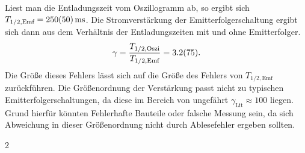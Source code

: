 \documentclass[10pt]{article}
\newenvironment{Figure}
  {\par\medskip\noindent\minipage{\linewidth}}
  {\endminipage\par\medskip}
\begin{document}
\begin{multicols}{2}
\begin{Figure}
        \end{Figure}
        Liest man die Entladungszeit vom Oszillogramm ab, so ergibt sich $T_{1/2,\text{Emf}}=\SI{250+-50}{\milli s}$.
        Die Stromverstärkung der Emitterfolgerschaltung ergibt sich dann aus dem Verhältnis der Entladungszeiten mit und ohne Emitterfolger.
        \begin{align} 
                \gamma =\dfrac{T_{1/2,\text{Oszi}}}{T_{1/2,\text{Emf}}}=\SI{3.2+-7.5}{}
        .\end{align} 
        Die Größe dieses Fehlers lässt sich auf die Größe des Fehlers von $T_{1/2,\text{Emf}}$ zurückführen.
        Die Größenordnung der Verstärkung passt nicht zu typischen Emitterfolgerschaltungen, da diese im Bereich von ungefährt $\gamma _{\text{Lit}}\approx 100$ liegen.
        Grund hierfür könnten Fehlerhafte Bauteile oder falsche Messung sein, da sich Abweichung in dieser Größenordnung nicht durch Ablesefehler ergeben sollten.
        
\end{multicols}{2}
\clearpage
\listoffigures
\listoftables



\end{document}
